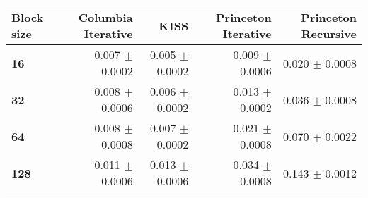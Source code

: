 \begin{tabular}{lrrrr}\toprule
\textbf{Block size}  & \textbf{Columbia Iterative} & \textbf{KISS} & \textbf{Princeton Iterative} & \textbf{Princeton Recursive}\\\midrule
\textbf{16}  & 0.007 $\pm$ 0.0002 & 0.005 $\pm$ 0.0002 & 0.009 $\pm$ 0.0006 & 0.020 $\pm$ 0.0008\\
\textbf{32}  & 0.008 $\pm$ 0.0006 & 0.006 $\pm$ 0.0002 & 0.013 $\pm$ 0.0002 & 0.036 $\pm$ 0.0008\\
\textbf{64}  & 0.008 $\pm$ 0.0008 & 0.007 $\pm$ 0.0002 & 0.021 $\pm$ 0.0008 & 0.070 $\pm$ 0.0022\\
\textbf{128} & 0.011 $\pm$ 0.0006 & 0.013 $\pm$ 0.0006 & 0.034 $\pm$ 0.0008 & 0.143 $\pm$ 0.0012\\
\bottomrule
\end{tabular}
